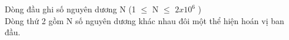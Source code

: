Dòng đầu ghi số nguyên dương N (1  $\le$  N  $\le$  $2x10^{6}$ )
\\Dòng thứ 2 gồm N số nguyên dương khác nhau đôi một thể hiện hoán vị ban đầu.